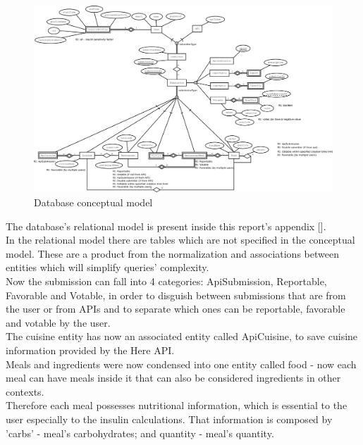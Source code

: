 \begin{figure}[H]    
    \includegraphics[scale=0.2]{_figures/Nutr.io_Database_Diagram.eps}
    \caption{Database conceptual model}
\end{figure}

The database's relational model is present inside this report's appendix [].\\

In the relational model there are tables which are not specified in the conceptual model.
These are a product from the normalization and associations between entities which will simplify queries' complexity.\\

Now the submission can fall into 4 categories: ApiSubmission, Reportable, Favorable and Votable, in order to disguish between submissions that
are from the user or from APIs and to separate which ones can be reportable, favorable and votable by the user.\\

The cuisine entity has now an associated entity called ApiCuisine, to save cuisine information provided by the Here API.\\

Meals and ingredients were now condensed into one entity called food - now each meal can have meals inside it that can also be considered
ingredients in other contexts.\\

Therefore each meal possesses nutritional information, which is essential to the user especially to the insulin calculations. That information is composed by
'carbs' - meal's carbohydrates; and quantity - meal's quantity.\\

